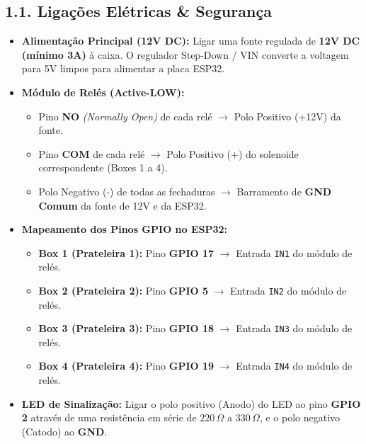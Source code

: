 \documentclass[11pt,a4paper]{article}
\begin{document}
\subsection*{1.1. Ligações Elétricas \& Segurança}
\begin{itemize}[leftmargin=*]
    \item \textbf{Alimentação Principal (12V DC):} Ligar uma fonte regulada de \textbf{12V DC (mínimo 3A)} à caixa. O regulador Step-Down / VIN converte a voltagem para 5V limpos para alimentar a placa ESP32.
    \item \textbf{Módulo de Relés (Active-LOW):}
    \begin{itemize}
        \item Pino \textbf{NO} \textit{(Normally Open)} de cada relé $\rightarrow$ Polo Positivo (+12V) da fonte.
        \item Pino \textbf{COM} de cada relé $\rightarrow$ Polo Positivo (+) do solenoide correspondente (Boxes 1 a 4).
        \item Polo Negativo (-) de todas as fechaduras $\rightarrow$ Barramento de \textbf{GND Comum} da fonte de 12V e da ESP32.
    \end{itemize}
    \item \textbf{Mapeamento dos Pinos GPIO no ESP32:}
    \begin{itemize}
        \item \textbf{Box 1 (Prateleira 1):} Pino \textbf{GPIO 17} $\rightarrow$ Entrada \texttt{IN1} do módulo de relés.
        \item \textbf{Box 2 (Prateleira 2):} Pino \textbf{GPIO 5} $\rightarrow$ Entrada \texttt{IN2} do módulo de relés.
        \item \textbf{Box 3 (Prateleira 3):} Pino \textbf{GPIO 18} $\rightarrow$ Entrada \texttt{IN3} do módulo de relés.
        \item \textbf{Box 4 (Prateleira 4):} Pino \textbf{GPIO 19} $\rightarrow$ Entrada \texttt{IN4} do módulo de relés.
    \end{itemize}
    \item \textbf{LED de Sinalização:} Ligar o polo positivo (Anodo) do LED ao pino \textbf{GPIO 2} através de uma resistência em série de $220\,\Omega$ a $330\,\Omega$, e o polo negativo (Catodo) ao \textbf{GND}.
\end{itemize}
\end{document}

